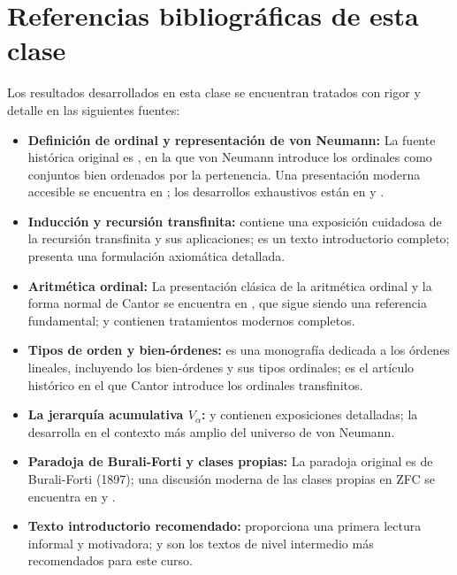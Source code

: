 \section*{Referencias bibliográficas de esta clase}

Los resultados desarrollados en esta clase se encuentran tratados con rigor y detalle en las siguientes fuentes:

\begin{itemize}[leftmargin=2em]
  \item \textbf{Definición de ordinal y representación de von Neumann:} La fuente histórica original es \cite{vonneumann1923}, en la que von Neumann introduce los ordinales como conjuntos bien ordenados por la pertenencia. Una presentación moderna accesible se encuentra en \cite{enderton1977}; los desarrollos exhaustivos están en \cite{jech2003} y \cite{kunen2011}.

  \item \textbf{Inducción y recursión transfinita:} \cite{enderton1977} contiene una exposición cuidadosa de la recursión transfinita y sus aplicaciones; \cite{hrbacek1999} es un texto introductorio completo; \cite{suppes1972} presenta una formulación axiomática detallada.

  \item \textbf{Aritmética ordinal:} La presentación clásica de la aritmética ordinal y la forma normal de Cantor se encuentra en \cite{sierpinski1958}, que sigue siendo una referencia fundamental; \cite{levy1979} y \cite{jech2003} contienen tratamientos modernos completos.

  \item \textbf{Tipos de orden y bien-órdenes:} \cite{rosenstein1982} es una monografía dedicada a los órdenes lineales, incluyendo los bien-órdenes y sus tipos ordinales; \cite{cantor1883} es el artículo histórico en el que Cantor introduce los ordinales transfinitos.

  \item \textbf{La jerarquía acumulativa $V_\alpha$:} \cite{kunen2011} y \cite{devlin1993} contienen exposiciones detalladas; \cite{jech2003} la desarrolla en el contexto más amplio del universo de von Neumann.

  \item \textbf{Paradoja de Burali-Forti y clases propias:} La paradoja original es de Burali-Forti (1897); una discusión moderna de las clases propias en ZFC se encuentra en \cite{jech2003} y \cite{mendelson2015}.

  \item \textbf{Texto introductorio recomendado:} \cite{halmos1960} proporciona una primera lectura informal y motivadora; \cite{hrbacek1999} y \cite{enderton1977} son los textos de nivel intermedio más recomendados para este curso.
\end{itemize}
